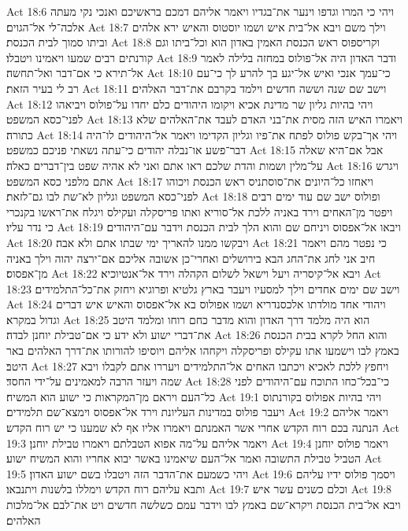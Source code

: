 Act 18:6  ויהי כי המרו וגדפו וינער את־בגדיו ויאמר אליהם דמכם בראשיכם ואנכי נקי מעתה אלכה־לי אל־הגוים׃
Act 18:7  וילך משם ויבא אל־בית איש ושמו יוסטוס והאיש ירא אלהים וביתו סמוך לבית הכנסת׃
Act 18:8  וקריספוס ראש הכנסת האמין באדון הוא וכל־ביתו וגם קורנתים רבים שמעו ויאמינו ויטבלו׃
Act 18:9  ודבר האדון היה אל־פולוס במחזה בלילה לאמר אל־תירא כי אם־דבר ואל־תחשה׃
Act 18:10  כי־עמך אנכי ואיש אל־יגע בך להרע לך כי־עם רב לי בעיר הזאת׃
Act 18:11  וישב שם שנה וששה חדשים וילמד בקרבם את־דבר האלהים׃
Act 18:12  ויהי בהיות גליון שר מדינת אכיא ויקומו היהודים כלם יחדו על־פולוס ויביאהו לפני־כסא המשפט׃
Act 18:13  ויאמרו האיש הזה מסית את־בני האדם לעבד את־האלהים שלא כתורה׃
Act 18:14  ויהי אך־בקש פולוס לפתח את־פיו וגליון הקדימו ויאמר אל־היהודים לו־היה דבר־פשע או־נבלה יהודים כי־עתה נשאתי פניכם כמשפט׃
Act 18:15  אבל אם־היא שאלה על־מלין ושמות והדת שלכם ראו אתם ואני לא אהיה שפט בין־דברים כאלה׃
Act 18:16  ויגרש אתם מלפני כסא המשפט׃
Act 18:17  ויאחזו כל־היונים את־סוסתניס ראש הכנסת ויכוהו לפני־כסא המשפט וגליון לא־שת לבו גם־לזאת׃
Act 18:18  ופולוס ישב שם עוד ימים רבים ויפטר מן־האחים וירד באניה ללכת אל־סוריא ואתו פריסקלה ועקילס ויגלח את־ראשו בקנכרי כי נדר עליו׃
Act 18:19  ויבאו אל־אפסוס ויניחם שם והוא הלך לבית הכנסת וידבר עם־היהודים׃
Act 18:20  ויבקשו ממנו להאריך ימי שבתו אתם ולא אבה׃
Act 18:21  כי נפטר מהם ויאמר חיב אני לחג את־החג הבא בירושלים ואחרי־כן אשובה אליכם אם־ירצה יהוה וילך באניה מן־אפסוס׃
Act 18:22  ויבא אל־קיסריה ויעל וישאל לשלום הקהלה וירד אל־אנטיוכיא׃
Act 18:23  וישב שם ימים אחדים וילך למסעיו ויעבר בארץ גלטיא ופרוגיא ויחזק את־כל־התלמידים׃
Act 18:24  ויהודי אחד מולדתו אלכסנדריא ושמו אפולוס בא אל־אפסוס והאיש איש דברים וגדול במקרא׃
Act 18:25  הוא היה מלמד דרך האדון והוא מדבר כחם רוחו ומלמד היטב את־דברי ישוע ולא ידע כי אם־טבילת יוחנן לבדה׃
Act 18:26  והוא החל לקרא בבית הכנסת באמץ לבו וישמעו אתו עקילס ופריסקלה ויקחהו אליהם ויוסיפו להורותו את־דרך האלהים באר היטב׃
Act 18:27  ויחפץ ללכת לאכיא ויכתבו האחים אל־התלמידים ויעררו אתם לקבלו ויבא שמה ויעזר הרבה למאמינים על־ידי החסד׃
Act 18:28  כי־בכל־כחו התוכח עם־היהודים לפני כל־העם ויראם מן־המקראות כי ישוע הוא המשיח׃
Act 19:1  ויהי בהיות אפולוס בקורנתוס ויעבר פולוס במדינות העליונת וירד אל־אפסוס וימצא־שם תלמידים׃
Act 19:2  ויאמר אליהם הנתנה בכם רוח הקדש אחרי אשר האמנתם ויאמרו אליו אף לא שמענו כי יש רוח הקדש׃
Act 19:3  ויאמר אליהם על־מה אפוא הטבלתם ויאמרו טבילת יוחנן׃
Act 19:4  ויאמר פולוס יוחנן הטביל טבילת התשובה ואמר אל־העם שיאמינו באשר יבוא אחריו והוא המשיח ישוע׃
Act 19:5  ויהי כשמעם את־הדבר הזה ויטבלו בשם ישוע האדון׃
Act 19:6  ויסמך פולוס ידיו עליהם ותבא עליהם רוח הקדש וימללו בלשנות ויתנבאו׃
Act 19:7  וכלם כשנים עשר איש׃
Act 19:8  ויבא אל־בית הכנסת ויקרא־שם באמץ לבו וידבר עמם כשלשה חדשים ויט את־לבם אל־מלכות האלהים׃
